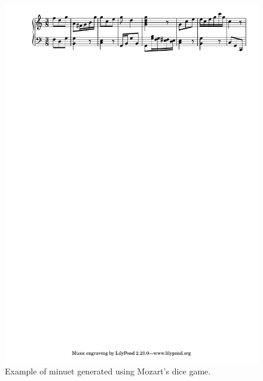\begin{figure}[!h]
 \centering
 \includegraphics[width=\columnwidth]{imgs/background/mozart_dice.pdf}
 \caption{Example of minuet generated using Mozart's dice game.}
 \label{fig:mozart_dice}
\end{figure}


